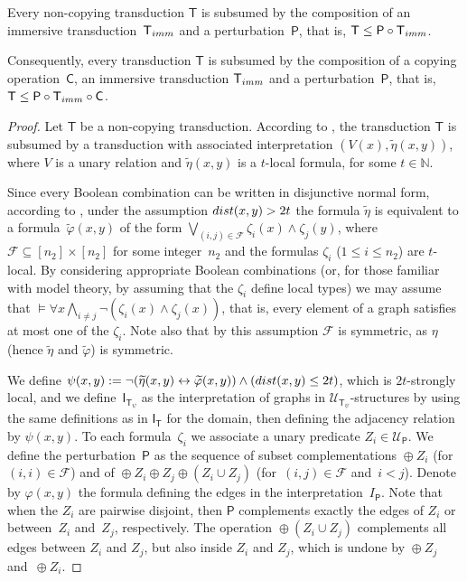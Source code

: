 \documentclass{lmcs}
\renewcommand{\phi}{\varphi}
\theoremstyle{definition}
\DeclareMathOperator{\comp}{\oplus}
\begin{document}
\pagebreak
\begin{thm}
	\label{thm:normal}
	Every non-copying transduction $\mathsf T$ is subsumed by the composition of an immersive transduction~$\mathsf T_{\rm imm}$ and a perturbation~$\mathsf P$, that is, $\mathsf T\leq \mathsf P\circ\mathsf T_{\rm imm}$.
	
	Consequently, every transduction $\mathsf T$ is subsumed by the composition of a
	copying operation~$\mathsf C$, an immersive transduction $\mathsf T_{\rm imm}$ and a perturbation~$\mathsf P$, that is, $\mathsf T\leq \mathsf P\circ\mathsf T_{\rm imm}\circ\mathsf C$.
\end{thm}
\begin{proof}
	Let $\mathsf T$
	be a non-copying transduction.
	According to , the transduction $\mathsf T$ is subsumed by a transduction with associated interpretation $(V(x),\widetilde{\eta}(x,y))$, where $V$ is a unary relation and $\widetilde{\eta}(x,y)$ is a $t$-local formula, for some $t\in\mathbb N$.
	
	Since every Boolean combination can be written in disjunctive normal form, according to ,  under the assumption ${\rm dist}(x,y)>2t$ the
	formula $\widetilde{\eta}$ is equivalent to a formula~$\widetilde{\phi}(x,y)$ of the form
	$\bigvee_{(i,j)\in\mathcal F}\zeta_i(x)\wedge\zeta_j(y)$, where
	$\mathcal F\subseteq [n_2]\times[n_2]$ for some integer~$n_2$ and the
	formulas $\zeta_i$ ($1\leq i\leq n_2$) are $t$-local. 
	By considering appropriate 
	Boolean combinations (or, for those familiar with model theory, by assuming that the $\zeta_i$ define local types)
	we may assume that \mbox{$\models \forall x \bigwedge_{i\neq j} \neg(\zeta_i(x)\wedge
		\zeta_j(x))$}, that is, every element of a graph satisfies at most one of the $\zeta_i$. 
	Note also that by this assumption $\mathcal F$ is symmetric, as $\eta$ (hence $\widetilde{\eta}$ and $\widetilde{\phi}$) is symmetric.
	
	We define 
	\mbox{$\psi(x,y):=\neg(\widetilde{\eta}(x,y)\leftrightarrow\widetilde{\phi}(x,y))\wedge ({\rm dist}(x,y)\leq 2t)$}, which is $2t$-strongly local, 
	and we define~$\mathsf I_{\mathsf T_\psi}$ as the interpretation of graphs in ${\mathcal U}_{\mathsf T_\psi}$-structures by using the same definitions as in $\mathsf I_{\mathsf T}$ for the domain, then defining the adjacency relation by $\psi(x,y)$.  
	To each formula~$\zeta_i$ we associate a unary 
	predicate $Z_i\in {\mathcal U}_{\mathsf P}$. We define the perturbation~$\mathsf{P}$
	as the sequence of subset complementations $\comp Z_i$ 
	(for~$(i,i)\in\mathcal F$) and of \mbox{$\comp Z_i\comp Z_j\comp (Z_i\cup Z_j)$} 
	(for~$(i,j)\in\mathcal F$ and~$i<j$). Denote by $\phi(x,y)$ the
	formula defining the edges in the interpretation~$I_\mathsf{P}$. Note that
	when the $Z_i$ are pairwise disjoint, then $\mathsf{P}$ complements
	exactly the edges of $Z_i$ or between~$Z_i$ and~$Z_j$, respectively. 
	The operation $\comp (Z_i\cup Z_j)$ complements all edges between
	$Z_i$ and $Z_j$, but also inside $Z_i$ and $Z_j$, which is undone by
	$\comp Z_j$ and~$\comp Z_i$. 
	

\end{proof}
\end{document}

